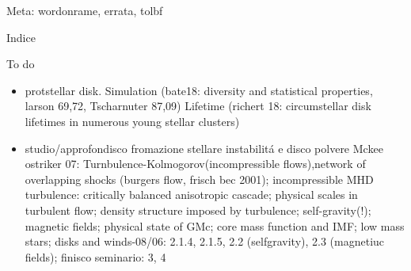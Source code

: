 \documentclass[10pt,xcolor={usenames},fleqn,mathserif,serif]{beamer}
\begin{document}


\begin{frame}
  \titlepage
  Meta: wordonrame, errata, tolbf
\end{frame}


\begin{frame}[allowframebreaks]{Indice}
\tableofcontents[onlyparts]
\end{frame}

\begin{wordonframe}{To do}
\begin{itemize}
\item protstellar disk.
Simulation (bate18: diversity and statistical properties, larson 69,72, Tscharnuter 87,09)
Lifetime (richert 18: circumstellar disk lifetimes in numerous young stellar clusters)
\item studio/approfondisco fromazione stellare instabilit\'a e disco polvere
Mckee ostriker 07: Turnbulence-Kolmogorov(incompressible flows),network of overlapping shocks (burgers flow, frisch bec 2001); incompressible MHD turbulence: critically balanced anisotropic cascade; physical scales in turbulent flow; density structure imposed by turbulence; self-gravity(!); magnetic fields; physical state of GMc; core mass function and IMF; low mass stars; disks and winds-08/06: 2.1.4, 2.1.5, 2.2 (selfgravity), 2.3 (magnetiuc fields); finisco seminario: 3, 4

\end{itemize}
\end{wordonframe}
\end{document}
